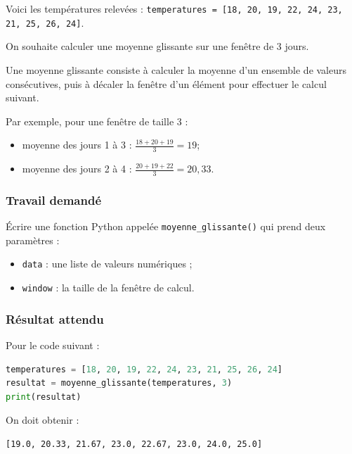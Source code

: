 \documentclass[
	fontsize=10pt, %
	twoside=true, %
]{kaobook}
\begin{document}
Voici les températures relevées : \lstinline{temperatures = [18, 20, 19, 22, 24, 23, 21, 25, 26, 24]}.


On souhaite calculer une moyenne glissante sur une fenêtre de 3 jours.


Une moyenne glissante consiste à calculer la moyenne d'un ensemble de valeurs consécutives, puis à décaler la fenêtre d'un élément pour effectuer le calcul suivant.

Par exemple, pour une fenêtre de taille 3 :
\begin{itemize}
    \item moyenne des jours 1 à 3 : 
    \(
    \frac{18+20+19}{3}=19
    \);
    \item moyenne des jours 2 à 4 :
    \(
    \frac{20+19+22}{3}=20{,}33
    \).
\end{itemize}

\subsubsection*{Travail demandé}

Écrire une fonction Python appelée \texttt{moyenne\_glissante()} qui prend deux paramètres :
\begin{itemize}
    \item \texttt{data} : une liste de valeurs numériques ;
    \item \texttt{window} : la taille de la fenêtre de calcul.
\end{itemize}

\subsubsection*{Résultat attendu}

Pour le code suivant :

\begin{lstlisting}[language=Python]
temperatures = [18, 20, 19, 22, 24, 23, 21, 25, 26, 24]
resultat = moyenne_glissante(temperatures, 3)
print(resultat)
\end{lstlisting}

On doit obtenir :

\begin{lstlisting}
[19.0, 20.33, 21.67, 23.0, 22.67, 23.0, 24.0, 25.0]
\end{lstlisting}
\end{document}
